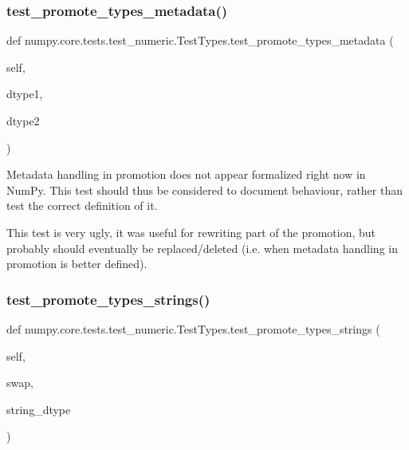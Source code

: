 \subsubsection{\texorpdfstring{test\+\_\+promote\+\_\+types\+\_\+metadata()}{test\_promote\_types\_metadata()}}
{\footnotesize\ttfamily def numpy.\+core.\+tests.\+test\+\_\+numeric.\+Test\+Types.\+test\+\_\+promote\+\_\+types\+\_\+metadata (\begin{DoxyParamCaption}\item[{}]{self,  }\item[{}]{dtype1,  }\item[{}]{dtype2 }\end{DoxyParamCaption})}

\begin{DoxyVerb}Metadata handling in promotion does not appear formalized
right now in NumPy. This test should thus be considered to
document behaviour, rather than test the correct definition of it.

This test is very ugly, it was useful for rewriting part of the
promotion, but probably should eventually be replaced/deleted
(i.e. when metadata handling in promotion is better defined).
\end{DoxyVerb}
 \mbox{\label{classnumpy_1_1core_1_1tests_1_1test__numeric_1_1TestTypes_a077075a7e0ff8ca6c4d7c9b9d2a1cb16}} 
\subsubsection{\texorpdfstring{test\+\_\+promote\+\_\+types\+\_\+strings()}{test\_promote\_types\_strings()}}
{\footnotesize\ttfamily def numpy.\+core.\+tests.\+test\+\_\+numeric.\+Test\+Types.\+test\+\_\+promote\+\_\+types\+\_\+strings (\begin{DoxyParamCaption}\item[{}]{self,  }\item[{}]{swap,  }\item[{}]{string\+\_\+dtype }\end{DoxyParamCaption})}

